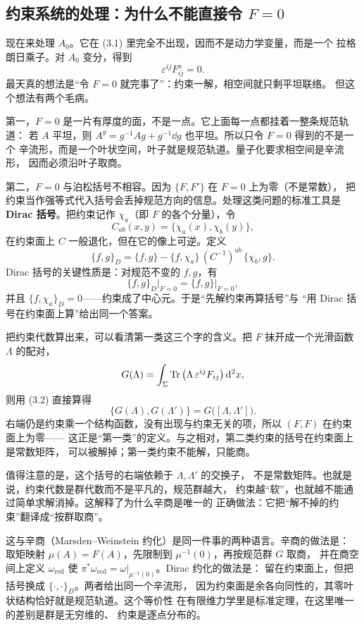 \subsection{约束系统的处理：为什么不能直接令 $F=0$}

现在来处理 $A_0$。它在 (3.1) 里完全不出现，因而不是动力学变量，而是一个
拉格朗日乘子。对 $A_0$ 变分，得到
\begin{equation}
\varepsilon^{ij}F_{ij}^a=0. \tag{3.3}
\end{equation}
最天真的想法是“令 $F=0$ 就完事了”：约束一解，相空间就只剩平坦联络。
但这个想法有两个毛病。

第一，$F=0$ 是一片有厚度的面，不是一点。它上面每一点都挂着一整条规范轨道：
若 $A$ 平坦，则 $A^{g}=g^{-1}Ag+g^{-1}\dd g$ 也平坦。所以只令 $F=0$ 得到的不是一个
辛流形，而是一个叶状空间，叶子就是规范轨道。量子化要求相空间是辛流形，
因而必须沿叶子取商。

第二，$F=0$ 与泊松括号不相容。因为 $\{F,F'\}$ 在 $F=0$ 上为零（不是常数），
把约束当作强等式代入括号会丢掉规范方向的信息。处理这类问题的标准工具是
\textbf{Dirac 括号}。把约束记作 $\chi_a$（即 $F$ 的各个分量），令
\[
C_{ab}(x,y)=\{\chi_a(x),\chi_b(y)\},
\]
在约束面上 $C$ 一般退化，但在它的像上可逆。定义
\[
\{f,g\}_D=\{f,g\}-\{f,\chi_a\}\,(C^{-1})^{ab}\,\{\chi_b,g\}.
\]
Dirac 括号的关键性质是：对规范不变的 $f,g$，有
\[
\{f,g\}_D\big|_{F=0}=\{f,g\}\big|_{F=0},
\]
并且 $\{f,\chi_a\}_D=0$——约束成了中心元。于是“先解约束再算括号”与
“用 Dirac 括号在约束面上算”给出同一个答案。

把约束代数算出来，可以看清第一类这三个字的含义。把 $F$ 抹开成一个光滑函数
$\Lambda$ 的配对，
\[
G(\Lambda)=\int_\Sigma \operatorname{Tr}\left(\Lambda\,\varepsilon^{ij}F_{ij}\right)\mathrm{d}^2x,
\]
则用 (3.2) 直接算得
\[
\{G(\Lambda),G(\Lambda')\}=G\big([\Lambda,\Lambda']\big).
\]
右端仍是约束乘一个结构函数，没有出现与约束无关的项，所以 $(F,F)$ 在约束面上为零——
这正是“第一类”的定义。与之相对，第二类约束的括号在约束面上是常数矩阵，
可以被解掉；第一类约束不能解，只能商。

值得注意的是，这个括号的右端依赖于 $\Lambda,\Lambda'$ 的交换子，
不是常数矩阵。也就是说，约束代数是群代数而不是平凡的，规范群越大，
约束越“软”，也就越不能通过简单求解消掉。这解释了为什么辛商是唯一的
正确做法：它把“解不掉的约束”翻译成“按群取商”。

这与辛商（Marsden--Weinstein 约化）是同一件事的两种语言。辛商的做法是：
取矩映射 $\mu(A)=F(A)$，先限制到 $\mu^{-1}(0)$，再按规范群 $G$ 取商，
并在商空间上定义 $\omega_{\text{red}}$ 使
$\pi^*\omega_{\text{red}}=\omega|_{\mu^{-1}(0)}$。Dirac 约化的做法是：
留在约束面上，但把括号换成 $\{\cdot,\cdot\}_D$。两者给出同一个辛流形，
因为约束面是余各向同性的，其零叶状结构恰好就是规范轨道。这个等价性
在有限维力学里是标准定理，在这里唯一的差别是群是无穷维的、
约束是逐点分布的。

